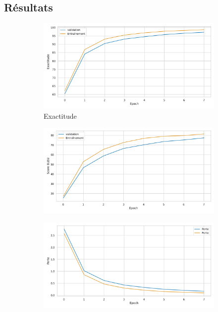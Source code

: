 \subsection{Résultats}%
\label{sub.results.training.results}
\begin{figure}[hbt]
    \begin{subfigure}{.5\textwidth}
        \caption{Exactitude}
        \begin{center}
            \includegraphics[width=\textwidth]{assets/python/accuracy.pdf}
        \end{center}
        \label{fig.results.training.accuracy}
    \end{subfigure}
    \begin{subfigure}{.5\textwidth}
        \caption{}
        \begin{center}
            \includegraphics[width=\textwidth]{assets/python/bleu.pdf}
        \end{center}
        \label{fig.results.training.bleu}
    \end{subfigure}
    \begin{subfigure}{.5\textwidth}
        \begin{center}
            \includegraphics[width=\textwidth]{assets/python/loss.pdf}

\end{center}
\end{subfigure}
\end{figure}

